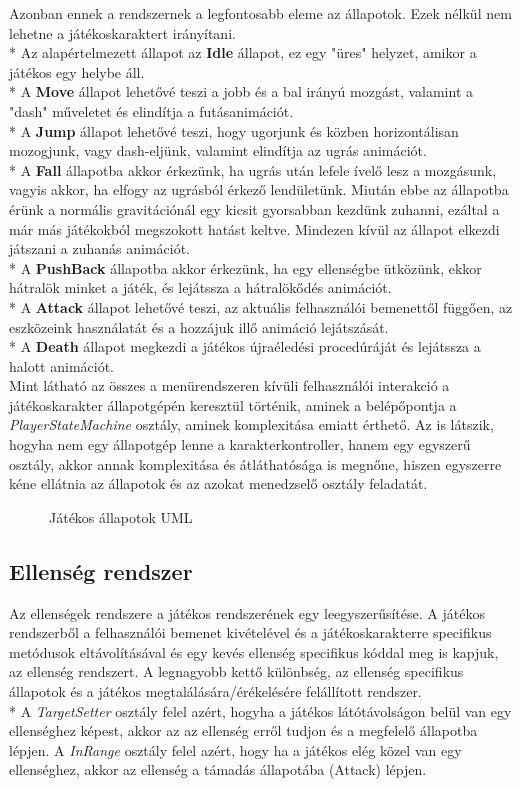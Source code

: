 Azonban ennek a rendszernek a legfontosabb eleme az állapotok. Ezek nélkül nem lehetne a játékoskaraktert irányítani.\\*
Az alapértelmezett állapot az \textbf{Idle} állapot, ez egy "üres" helyzet, amikor a játékos egy helybe áll.\\*
A \textbf{Move} állapot lehetővé teszi a jobb és a bal irányú mozgást, valamint a "dash" műveletet és elindítja a futásanimációt.\\*
A \textbf{Jump} állapot lehetővé teszi, hogy ugorjunk és közben horizontálisan mozogjunk, vagy dash-eljünk, valamint elindítja az ugrás animációt.\\*
A \textbf{Fall} állapotba akkor érkezünk, ha ugrás után lefele ívelő lesz a mozgásunk, vagyis akkor, ha elfogy az ugrásból érkező lendületünk. Miután ebbe az állapotba érünk a normális gravitációnál egy kicsit gyorsabban kezdünk zuhanni, ezáltal a már más játékokból megszokott hatást keltve. Mindezen kívül az állapot elkezdi játszani a zuhanás animációt.\\*
A \textbf{PushBack} állapotba akkor érkezünk, ha egy ellenségbe ütközünk, ekkor hátralök minket a játék, és lejátssza a hátralökődés animációt.\\*
A \textbf{Attack} állapot lehetővé teszi, az aktuális felhasználói bemenettől függően, az eszközeink használatát és a hozzájuk illő animáció lejátszását.\\*
A \textbf{Death} állapot megkezdi a játékos újraéledési procedúráját és lejátssza a halott animációt.\\
Mint látható az összes a menürendszeren kívüli felhasználói interakció a játékoskarakter állapotgépén keresztül történik, aminek a belépőpontja a \textit{PlayerStateMachine} osztály, aminek komplexitása emiatt érthető. Az is látszik, hogyha nem egy állapotgép lenne a karakterkontroller, hanem egy egyszerű osztály, akkor annak komplexitása és átláthatósága is megnőne, hiszen egyszerre kéne ellátnia az állapotok és az azokat menedzselő osztály feladatát.

\begin{figure}[H]
	\noindent{}
	\caption{Játékos állapotok UML}
	\label{PlayerSystem2}
\end{figure}

\subsection{Ellenség rendszer}
Az ellenségek rendszere a játékos rendszerének egy leegyszerűsítése. A játékos rendszerből a felhasználói bemenet kivételével és a játékoskarakterre specifikus metódusok eltávolításával és egy kevés ellenség specifikus kóddal meg is kapjuk, az ellenség rendszert. A legnagyobb kettő különbség, az ellenség specifikus állapotok és a játékos megtalálására/érékelésére felállított rendszer.\\*
A \textit{TargetSetter} osztály felel azért, hogyha a játékos látótávolságon belül van egy ellenséghez képest, akkor az az ellenség erről tudjon és a megfelelő állapotba lépjen. A \textit{InRange} osztály felel azért, hogy ha a játékos elég közel van egy ellenséghez, akkor az ellenség a támadás állapotába (Attack) lépjen.

